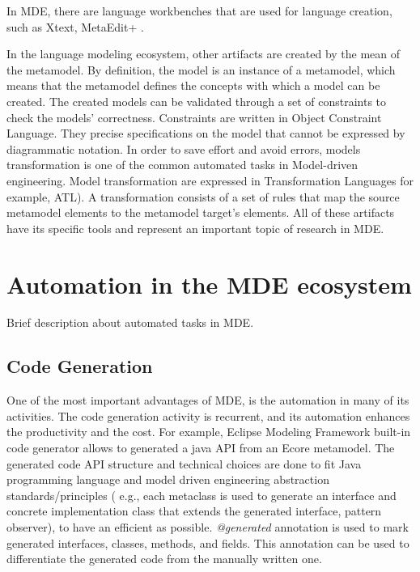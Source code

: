 In MDE, there are language workbenches that are used for language creation, such as Xtext, MetaEdit+ \cite{wortmann2020modeling}.



In the language modeling ecosystem, other artifacts are created by the mean of the metamodel. By definition, the model is an instance of a metamodel, which means that the metamodel defines the concepts with which a model can be created. The created models can be validated through a set of constraints to check the models' correctness. Constraints are written in Object Constraint Language. They precise specifications on the model that cannot be  expressed by diagrammatic notation. In order to save effort and avoid errors, models transformation is one of the common automated tasks in Model-driven engineering. Model transformation are expressed in  Transformation Languages for example, ATL). A transformation consists of a set of rules that map the source metamodel elements to the metamodel target’s elements. All of these artifacts have its specific tools and represent an important topic of research in MDE.


\section{Automation in the MDE ecosystem}
\label{mde_automation}
Brief description about automated tasks in MDE.

\subsection{Code Generation}

One of the most important advantages of MDE, is the automation in many of its activities. The code generation activity is recurrent, and its automation enhances the productivity and the cost.
For example, Eclipse Modeling Framework built-in code generator allows to generated a java API from an Ecore metamodel. The generated code API structure and technical choices are done to fit Java programming language and model driven engineering abstraction standards/principles ( e.g., each metaclass is used to generate an interface and concrete implementation class that extends the generated interface, pattern observer), to have an efficient as possible.
\textit{@generated} annotation is used to mark generated interfaces, classes, methods, and fields. This annotation can be used to differentiate the generated code from the manually written one.

